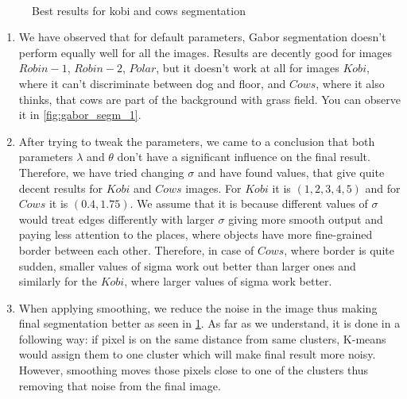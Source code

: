 \documentclass{article}
\begin{document}
\begin{figure}[h]
    \centering
    \caption{Best results for kobi and cows segmentation}
    \\
    \label{fig:gabor_segm_3}
\end{figure}
\begin{enumerate}
    \item We have observed that for default parameters, Gabor segmentation doesn't perform equally well for all the images. Results are decently good for images $Robin-1$, $Robin-2$, $Polar$, but it doesn't work at all for images $Kobi$, where it can't discriminate between dog and floor, and $Cows$, where it also thinks, that cows are part of the background with grass field. You can observe it in \cref{fig:gabor_segm_1}.
    
    \item After trying to tweak the parameters, we came to a conclusion that both parameters $\lambda$ and $\theta$ don't have a significant influence on the final result. Therefore, we have tried changing $\sigma$ and have found values, that give quite decent results for $Kobi$ and $Cows$ images. For $Kobi$ it is $(1, 2, 3, 4, 5)$ and for $Cows$ it is $(0.4, 1.75)$. We assume that it is because different values of $\sigma$ would treat edges differently with larger $\sigma$ giving more smooth output and paying less attention to the places, where objects have more fine-grained border between each other. Therefore, in case of $Cows$, where border is quite sudden, smaller values of sigma work out better than larger ones and similarly for the $Kobi$, where larger values of sigma work better.
    
    \item When applying smoothing, we reduce the noise in the image thus making final segmentation better as seen in \cref{fig:gabor_segm_3}. As far as we understand, it is done in a following way: if pixel is on the same distance from same clusters, K-means would assign them to one cluster which will make final result more noisy. However, smoothing moves those pixels close to one of the clusters thus removing that noise from the final image.
\end{enumerate}
\end{document}
